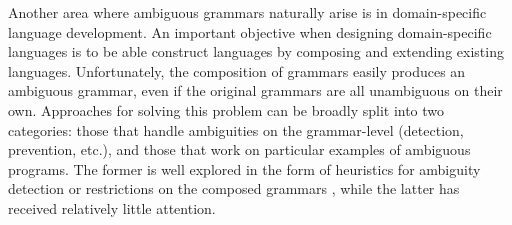 \documentclass[acmsmall,review,anonymous]{acmart}\settopmatter{printfolios=true,printccs=false,printacmref=false}
\begin{document}
Another area where ambiguous grammars naturally arise is
in domain-specific language development.  An important
objective when designing domain-specific languages is to be able construct
languages by composing and extending existing
languages.
Unfortunately, the composition of
%
grammars easily produces
an ambiguous grammar, even if the original grammars are all
unambiguous on their own. Approaches for solving this problem can be broadly split
into two categories: those that handle ambiguities on the
grammar-level (detection, prevention, etc.), and those that work on
particular examples of ambiguous programs. The former is well explored
in the form of heuristics for ambiguity detection
\cite{bastenAmbiguityDetectionProgramming2011,axelssonAnalyzingContextFreeGrammars2008,brabrandAnalyzingAmbiguityContextFree2007}
or restrictions on the composed grammars
\cite{kaminskiModularWellDefinednessAnalysis2013}, while the
latter has received relatively little attention.




\end{document}

